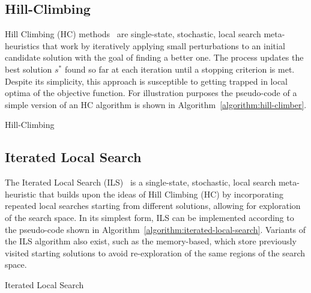 \subsection{Hill-Climbing}

Hill Climbing (HC) methods~\cite{luke2013essentialsa} are single-state,
stochastic, local search meta-heuristics that work by iteratively applying small
perturbations to an initial candidate solution with the goal of finding a better
one. The process updates the best solution $s^{*}$ found so far at each iteration
until a stopping criterion is met. Despite its simplicity, this approach is
susceptible to getting trapped in local optima of the objective function.  For
illustration purposes the pseudo-code of a simple version of an HC algorithm is
shown in Algorithm~\ref{algorithm:hill-climber}.

\begin{algorithm}[htb!]
  \DontPrintSemicolon
  \caption{Hill-Climbing}
  \label{algorithm:hill-climber}
\end{algorithm}

\subsection{Iterated Local Search}

The Iterated Local Search (ILS)~\cite{lourenco2010iterateda,luke2013essentialsa,
  blummetaheuristics} is a single-state, stochastic, local search meta-heuristic
that builds upon the ideas of Hill Climbing (HC) by incorporating repeated local
searches starting from different solutions, allowing for exploration of the
search space. In its simplest form, ILS can be implemented according to the
pseudo-code shown in Algorithm~\ref{algorithm:iterated-local-search}. Variants
of the ILS algorithm also exist, such as the memory-based, which store previously
visited starting solutions to avoid re-exploration of the same regions of the
search space.

\begin{algorithm}[htb!]
  \DontPrintSemicolon
  \caption{Iterated Local Search}
  \label{algorithm:iterated-local-search}
\end{algorithm}

